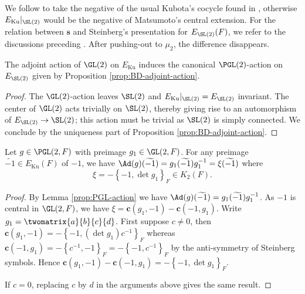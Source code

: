 \documentclass[a4paper,10pt]{article}
\begin{document}
\begin{remark}\label{rem:Kubota-minus}
	We follow \cite[Corollaire 5.12]{Mat69} to take the negative of the usual Kubota's cocycle found in \cite{Ku69, Fl80, KP84}, otherwise $E_{\text{Ku}}|_{\SL(2)}$ would be the negative of Matsumoto's central extension. For the relation between $\bm{s}$ and Steinberg's presentation for $E_{\SL(2)}(F)$, we refer to the discussions preceding \cite[Corollaire 5.12]{Mat69}. After pushing-out to $\mu_2$, the difference disappears.
\end{remark}

\begin{lemma}\label{prop:PGL-action}
	The adjoint action of $\GL(2)$ on $E_{\mathrm{Ku}}$ induces the canonical $\PGL(2)$-action on $E_{\SL(2)}$ given by Proposition \ref{prop:BD-adjoint-action}.
\end{lemma}
\begin{proof}
	The $\GL(2)$-action leaves $\SL(2)$ and $E_{\text{Ku}}|_{\SL(2)} = E_{\SL(2)}$ invariant. The center of $\GL(2)$ acts trivially on $\SL(2)$, thereby giving rise to an automorphism of $E_{\SL(2)} \to \SL(2)$; this action must be trivial as $\SL(2)$ is simply connected. We conclude by the uniqueness part of Proposition \ref{prop:BD-adjoint-action}.
\end{proof}

\begin{lemma}\label{prop:-1-adjoint}
	Let $g \in \PGL(2,F)$ with preimage $g_1 \in \GL(2,F)$. For any preimage $\widetilde{-1} \in E_{\mathrm{Ku}}(F)$ of $-1$, we have $\Ad(g)(\widetilde{-1}) = g_1 (\widetilde{-1}) g_1^{-1} = \xi (\widetilde{-1})$ where
	\[ \xi = -\left\{ -1, \det g_1 \right\}_F \in K_2(F). \]
\end{lemma}
\begin{proof}
	By Lemma \ref{prop:PGL-action} we have $\Ad(g)(\widetilde{-1}) = g_1(\widetilde{-1})g_1^{-1}$. As $-1$ is central in $\GL(2,F)$, we have $\xi = \bm{c}(g_1, -1) - \bm{c}(-1, g_1)$. Write $g_1 = \twomatrix{a}{b}{c}{d}$. First suppose $c \neq 0$, then $\bm{c}(g_1, -1) = -\left\{ -1, (\det g_1) c^{-1} \right\}_F$ whereas $\bm{c}(-1, g_1) = -\left\{ c^{-1}, -1 \right\}_F = -\left\{ -1, c^{-1} \right\}_F$ by the anti-symmetry of Steinberg symbols. Hence $\bm{c}(g_1, -1) - \bm{c}(-1, g_1) = -\left\{ -1, \det g_1 \right\}_F$.
	
	If $c = 0$, replacing $c$ by $d$ in the arguments above gives the same result.
\end{proof}
\end{document}

